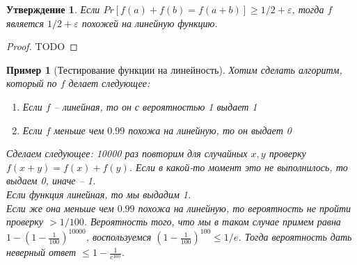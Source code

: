 \documentclass[12pt, letterpaper]{article}
\newtheorem{prop}{Утверждение}[section]
\newtheorem{sample}{Пример}[section]
\newcommand{\e}{\varepsilon}
\begin{document}
\begin{prop}
Если $Pr[f(a) + f(b) = f(a+b)] \geq 1/2 + \e$, тогда $f$ является $1/2+\e$ похожей на линейную функцию.
\end{prop}
\begin{proof}
TODO
\end{proof}

\begin{sample}[Тестирование функции на линейность]
Хотим сделать алгоритм, который по $f$ делает следующее:
\begin{enumerate}
\item Если $f$ -- линейная, то он с вероятностью 1 выдает 1
\item Если $f$ меньше чем $0.99$ похожа на линейную, то он выдает 0
\end{enumerate}
Сделаем следующее: 10000 раз повторим для случайных $x,y$ проверку $f(x+y) = f(x) +f(y)$. Если 
в какой-то момент это не выполнилось, то выдаем 0, иначе -- 1.\\
Если функция линейная, то мы выдадим 1.\\
Если же она меньше чем $0.99$ похожа на линейную, то вероятность не пройти проверку $>1/100$. Вероятность того, что мы в таком случае примем равна $1-(1-\frac{1}{100})^{10000}$, воспользуемся $(1 - \frac{1}{100})^{100} \leq 1/e$. Тогда вероятность дать неверный ответ $\leq 1 - \frac{1}{e^{100}}$.
\end{sample}
\end{document}
